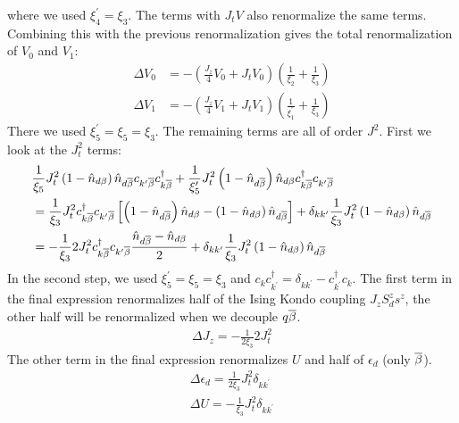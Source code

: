 \documentclass[12pt,twoside]{article}
\numberwithin{equation}{section}
\begin{document}
where we used \(\xi_4^\prime = \xi_3\). The terms with \(J_t V\) also renormalize the same terms. Combining this with the previous renormalization gives the total renormalization of \(V_0\) and \(V_1\):
\begin{equation}\begin{aligned}
	\label{V}
	\Delta V_0 &= -\left(\frac{J_z}{4}V_0 + J_t V_0\right) \left(\frac{1}{\xi_2} + \frac{1}{\xi_3}\right)\\
	\Delta V_1 &= -\left(\frac{J_z}{4}V_1 + J_t V_1\right) \left(\frac{1}{\xi^\prime_1} + \frac{1}{\xi_3}\right)
\end{aligned}\end{equation}
There we used \(\xi_5^\prime = \xi_5 = \xi_3\).
\pb The remaining terms are all of order \(J^2\). First we look at the \(J_t^2\) terms:
\begin{equation}\begin{aligned}
&\frac{1}{\xi_5}J_t^2 \left( 1 - \hat n_{d\beta} \right) \hat n_{d\overline\beta} c_{k^\prime\overline\beta}c^\dagger_{k\overline\beta} + \frac{1}{\xi^\prime_5}J_t^2 \left( 1 - \hat n_{d\overline\beta} \right) \hat n_{d\beta} c^\dagger_{k\overline\beta} c_{k^\prime\overline\beta}\\
&=\frac{1}{\xi_3}J_t^2 c^\dagger_{k\overline\beta} c_{k^\prime\overline\beta}\left[\left( 1 - \hat n_{d\overline\beta} \right) \hat n_{d\beta} - \left( 1 - \hat n_{d\beta} \right) \hat n_{d\overline\beta}\right]  + \delta_{kk^\prime} \frac{1}{\xi_3}J_t^2\left( 1 - \hat n_{d\beta} \right) \hat n_{d\overline\beta}\\
&=-\frac{1}{\xi_3}2J_t^2 c^\dagger_{k\overline\beta} c_{k^\prime\overline\beta}\frac{\hat n_{d\overline\beta} - \hat n_{d\beta}}{2}  + \delta_{kk^\prime} \frac{1}{\xi_3}J_t^2\left( 1 - \hat n_{d\beta} \right) \hat n_{d\overline\beta}
\end{aligned}\end{equation}
In the second step, we used \(\xi_5^\prime = \xi_5 = \xi_3\) and \(c_k c^\dagger_{k^\prime} = \delta_{kk^\prime} - c^\dagger_{k^\prime}c_k\). The first term in the final expression renormalizes half of the Ising Kondo coupling \(J_z S^z_d s^z\), the other half will be renormalized when we decouple \(q\overline\beta\).
\begin{equation}\begin{aligned}
	\label{Jz}
	\Delta J_z = -\frac{1}{2\xi_3}2J_t^2
\end{aligned}\end{equation}
The other term in the final expression renormalizes \(U\) and half of \(\epsilon_d\) (only \(\overline\beta\)).
\begin{equation}\begin{aligned}
	\label{edU3}
	\Delta \epsilon_d = \frac{1}{2\xi_3}J_t^2 \delta_{kk^\prime}\\
	\Delta U = -\frac{1}{\xi_3}J_t^2\delta_{kk^\prime}\\
\end{aligned}\end{equation}
\end{document}
